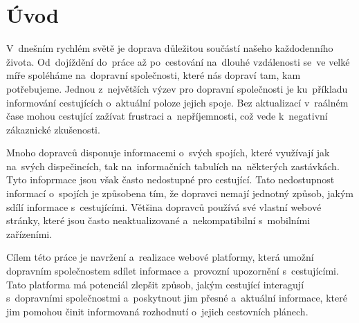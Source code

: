 \chapter{Úvod}
V~dnešním rychlém světě je doprava důležitou součástí našeho každodenního života. Od~dojíždění do~práce až po~cestování na~dlouhé vzdálenosti se~ve velké míře spoléháme na~dopravní společnosti, které nás dopraví tam, kam potřebujeme. Jednou z~největších výzev pro dopravní společnosti je ku~příkladu informování cestujících o~aktuální poloze jejich spoje. Bez aktualizací v~raálném čase mohou cestující zažívat frustraci a~nepříjemnosti, což vede k~negativní zákaznické zkušenosti.\par
Mnoho dopravců disponuje informacemi o~svých spojích, které využívají jak na~svých dispečincích, tak na~informačních tabulích na~některých zastávkách. Tyto infoprmace jsou však často nedostupné pro cestující. Tato nedostupnost informací o~spojích je způsobena tím, že dopravci nemají jednotný způsob, jakým sdílí informace s~cestujícími. Většina dopravců používá své vlastní webové stránky, které jsou často neaktualizované a~nekompatibilní s~mobilními zařízeními.\par
Cílem této práce je navržení a~realizace webové platformy, která umožní dopravním společnostem sdílet informace a~provozní upozornění s~cestujícími. Tato platforma má potenciál zlepšit způsob, jakým cestující interagují s~dopravními společnostmi a~poskytnout jim přesné a~aktuální informace, které jim pomohou činit informovaná rozhodnutí o~jejich cestovních plánech.